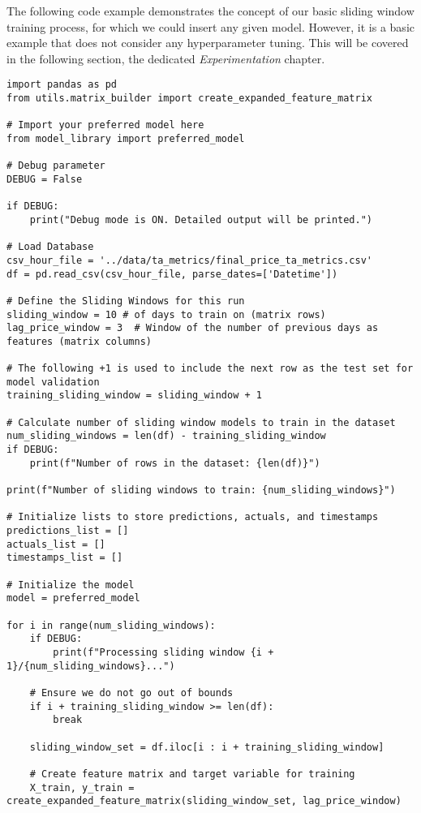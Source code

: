\documentclass[12pt]{report} %
\begin{document}
The following code example demonstrates the concept of our basic sliding window training process, for which we could insert any given model. However, it is a basic example that does not consider any hyperparameter tuning. This will be covered in the following section, the dedicated \textit{Experimentation} chapter.
\begin{lstlisting}
import pandas as pd
from utils.matrix_builder import create_expanded_feature_matrix

# Import your preferred model here
from model_library import preferred_model

# Debug parameter
DEBUG = False

if DEBUG:
    print("Debug mode is ON. Detailed output will be printed.")

# Load Database
csv_hour_file = '../data/ta_metrics/final_price_ta_metrics.csv'
df = pd.read_csv(csv_hour_file, parse_dates=['Datetime'])

# Define the Sliding Windows for this run
sliding_window = 10 # of days to train on (matrix rows)
lag_price_window = 3  # Window of the number of previous days as features (matrix columns)

# The following +1 is used to include the next row as the test set for model validation
training_sliding_window = sliding_window + 1

# Calculate number of sliding window models to train in the dataset
num_sliding_windows = len(df) - training_sliding_window
if DEBUG:
    print(f"Number of rows in the dataset: {len(df)}")

print(f"Number of sliding windows to train: {num_sliding_windows}")

# Initialize lists to store predictions, actuals, and timestamps
predictions_list = []
actuals_list = []
timestamps_list = []

# Initialize the model
model = preferred_model

for i in range(num_sliding_windows):
    if DEBUG:
        print(f"Processing sliding window {i + 1}/{num_sliding_windows}...")

    # Ensure we do not go out of bounds
    if i + training_sliding_window >= len(df):
        break
    
    sliding_window_set = df.iloc[i : i + training_sliding_window]
    
    # Create feature matrix and target variable for training
    X_train, y_train = create_expanded_feature_matrix(sliding_window_set, lag_price_window)
    

\end{lstlisting}
\end{document}

